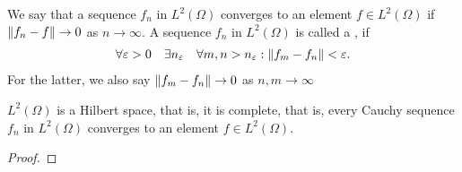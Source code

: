 \begin{definition}
  We say that a sequence $f_n$ in $L^2(\Omega)$ converges to an
  element $f\in L^2(\Omega)$ if $\left\|f_n-f\right\|\to 0$ as $n\to\infty$. A
  sequence $f_n$ in $L^2(\Omega)$ is called a , if
  \begin{gather}
    \forall \varepsilon>0
    \quad \exists n_\varepsilon
    \quad\forall m,n>n_\varepsilon :
    \left\|f_m-f_n\right\| < \varepsilon.
  \end{gather}
  For the latter, we also say $\left\|f_m-f_n\right\|\to 0$ as $n,m\to\infty$
\end{definition}

\begin{theorem}
  $L^2(\Omega)$ is a Hilbert space, that is, it is complete, that is,
  every Cauchy sequence $f_n$ in $L^2(\Omega)$ converges to an
  element $f\in L^2(\Omega)$.
\end{theorem}

\begin{todo}
  \begin{proof}
    
  \end{proof}
\end{todo}


